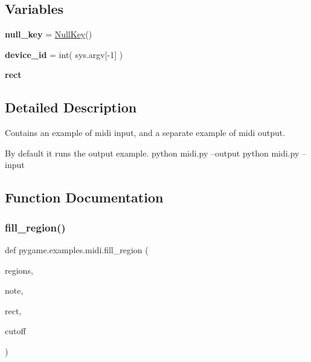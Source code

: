 \subsection*{Variables}
\begin{DoxyCompactItemize}
\item 
\mbox{\label{namespacepygame_1_1examples_1_1midi_a1be5979893d6285a4b0ccd3aaf58ff8c}} 
{\bfseries null\+\_\+key} = \hyperlink{classpygame_1_1examples_1_1midi_1_1_null_key}{Null\+Key}()
\item 
\mbox{\label{namespacepygame_1_1examples_1_1midi_a493900274328f230d03446380d993b84}} 
{\bfseries device\+\_\+id} = int( sys.\+argv\mbox{[}-\/1\mbox{]} )
\item 
\mbox{\label{namespacepygame_1_1examples_1_1midi_a7ace96fd60c2acc03a77371af110b399}} 
{\bfseries rect}
\end{DoxyCompactItemize}


\subsection{Detailed Description}
\begin{DoxyVerb}Contains an example of midi input, and a separate example of midi output.

By default it runs the output example.
python midi.py --output
python midi.py --input\end{DoxyVerb}
 

\subsection{Function Documentation}
\mbox{\label{namespacepygame_1_1examples_1_1midi_aad53e9f7989680c93ad32887ca7f833a}} 
\subsubsection{\texorpdfstring{fill\+\_\+region()}{fill\_region()}}
{\footnotesize\ttfamily def pygame.\+examples.\+midi.\+fill\+\_\+region (\begin{DoxyParamCaption}\item[{}]{regions,  }\item[{}]{note,  }\item[{}]{rect,  }\item[{}]{cutoff }\end{DoxyParamCaption})}

